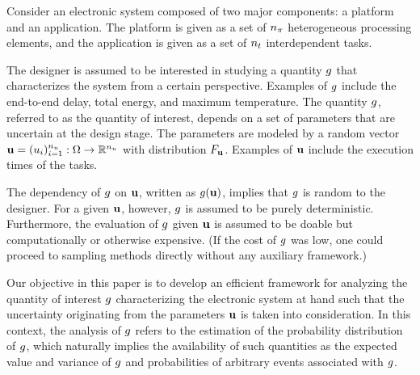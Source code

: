 Consider an electronic system composed of two major components: a platform and
an application. The platform is given as a set of ${n_\pi}$ heterogeneous processing
elements, and the application is given as a set of ${n_t}$ interdependent tasks.

The designer is assumed to be interested in studying a quantity $g$ that
characterizes the system from a certain perspective. Examples of $g$ include
the end-to-end delay, total energy, and maximum temperature. The quantity $g$,
referred to as the quantity of interest, depends on a set of parameters that are
uncertain at the design stage. The parameters are modeled by a random vector
$\mathbf{u} = (u_i)_{i = 1}^{n_u}: \Omega \to \mathbb{R}^{n_u}$ with distribution
$F_{\mathbf{u}}$. Examples of $\mathbf{u}$ include the execution times of the tasks.

The dependency of $g$ on $\mathbf{u}$, written as $g(\mathbf{u})$, implies that $g$ is
random to the designer. For a given $\mathbf{u}$, however, $g$ is assumed to be purely
deterministic. Furthermore, the evaluation of $g$ given $\mathbf{u}$ is assumed to be
doable but computationally or otherwise expensive. (If the cost of $g$ was low,
one could proceed to sampling methods directly without any auxiliary framework.)

Our objective in this paper is to develop an efficient framework for analyzing
the quantity of interest $g$ characterizing the electronic system at hand such
that the uncertainty originating from the parameters $\mathbf{u}$ is taken into
consideration. In this context, the analysis of $g$ refers to the estimation of
the probability distribution of $g$, which naturally implies the availability
of such quantities as the expected value and variance of $g$ and probabilities
of arbitrary events associated with $g$.
